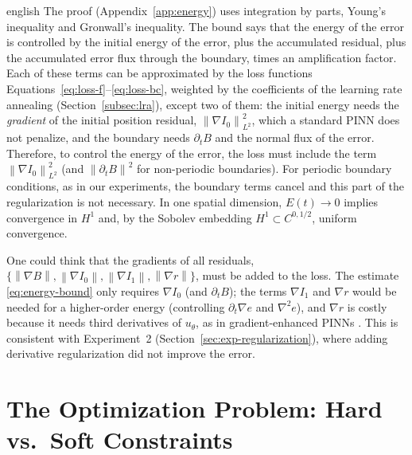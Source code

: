 \documentclass[12pt,letterpaper,twoside]{book}
\newcommand{\norm}[1]{\left\lVert #1 \right\rVert}
\begin{document}
\begin{hyphenrules}{english}
The proof (Appendix~\ref{app:energy}) uses integration by parts, Young's inequality and Gronwall's inequality.
The bound says that the energy of the error is controlled by the initial energy of the error, plus the
accumulated residual, plus the accumulated error flux through the boundary, times an amplification
factor. Each of these terms can be approximated by the loss functions
Equations~\eqref{eq:loss-f}--\eqref{eq:loss-bc}, weighted by the coefficients of the learning rate annealing
(Section~\ref{subsec:lra}), except two of them: the initial energy needs the \emph{gradient} of the initial
position residual, $\norm{\nabla I_0}^2_{L^2}$, which a standard PINN does not penalize, and the boundary
needs $\partial_tB$ and the normal flux of the error. Therefore, to control the energy of the error, the
loss must include the term $\norm{\nabla I_0}^2_{L^2}$ (and $\norm{\partial_tB}^2$ for non-periodic
boundaries). For periodic boundary conditions, as in our experiments, the boundary terms cancel and this
part of the regularization is not necessary. In one spatial dimension, $E(t)\to0$ implies convergence
in $H^1$ and, by the Sobolev embedding $H^1\subset C^{0,1/2}$, uniform convergence.

\begin{remarkbox}
One could think that the gradients of all residuals,
$\{\norm{\nabla B},\norm{\nabla I_0},\norm{\nabla I_1},\norm{\nabla r}\}$, must be added to the loss.
The estimate \eqref{eq:energy-bound} only requires $\nabla I_0$ (and $\partial_tB$); the terms
$\nabla I_1$ and $\nabla r$ would be needed for a higher-order energy (controlling $\partial_t\nabla e$
and $\nabla^2e$), and $\nabla r$ is costly because it needs third derivatives of $u_\theta$, as in
gradient-enhanced PINNs \cite{yu2022gpinn}. This is consistent with Experiment~2
(Section~\ref{sec:exp-regularization}), where adding derivative regularization did not improve the error.
\end{remarkbox}

\section{The Optimization Problem: Hard vs.\ Soft Constraints}\label{sec:optimization}


\end{hyphenrules}
\end{document}
